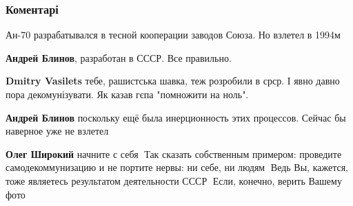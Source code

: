  
 
 
 
 
\subsubsection{Коментарі}
\label{sec:24_08_2021.fb.vasilec_dmitrij.1.sssr_aviacia_nezalezhnist_parad.cmt}

\begin{itemize}


Ан-70 разрабатывался в тесной кооперации заводов Союза. Но взлетел в 1994м

\begin{itemize}

 
\textbf{Андрей Блинов}, разработан в СССР. Все правильно.

 
\textbf{Dmitry Vasilets} тебе, рашистська шавка, теж розробили в срср. І явно давно пора декомунізувати. Як казав гєпа "помножити на ноль".

 
\textbf{Андрей Блинов} поскольку ещё была инерционность этих процессов. Сейчас бы наверное уже не взлетел🤔


\textbf{Олег Широкий} начните с себя🤔 Так сказать собственным примером: проведите самодекоммунизацию и не портите нервы: ни себе, ни людям🤔 Ведь Вы, кажется, тоже являетесь результатом деятельности СССР🤔 Если, конечно, верить Вашему фото🤔
\end{itemize}


\end{itemize}
